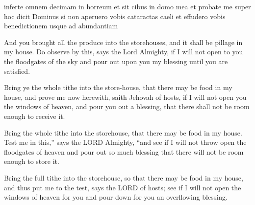 			\begin{versebox}
					\item[BHS] 
					\item[LXX] 
					\item[BSV] inferte omnem decimam in horreum et sit cibus in domo mea et probate me super hoc dicit Dominus si non aperuero vobis cataractas caeli et effudero vobis benedictionem usque ad abundantiam
					\item[NETS] And you brought all the produce into the storehouses, and it shall be pillage in my house. Do observe by this, says the Lord Almighty, if I will not open to you the floodgates of the sky and pour out upon you my blessing until you are satisfied. 
					\item[ASV] Bring ye the whole tithe into the store-house, that there may be food in my house, and prove me now herewith, saith Jehovah of hosts, if I will not open you the windows of heaven, and pour you out a blessing, that there shall not be room enough to receive it.
					\item[NIV] Bring the whole tithe into the storehouse, that there may be food in my house. Test me in this,” says the LORD Almighty, “and see if I will not throw open the floodgates of heaven and pour out so much blessing that there will not be room enough to store it.
					\item[NRSV] Bring the full tithe into the storehouse, so that there may be food in my house, and thus put me to the test, says the LORD of hosts; see if I will not open the windows of heaven for you and pour down for you an overflowing blessing.
			\end{versebox}

